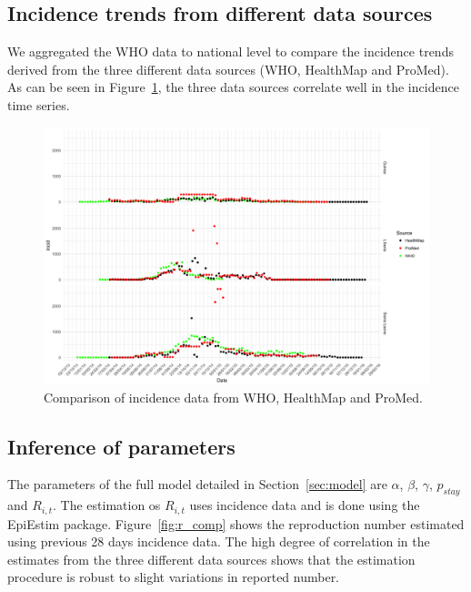 \documentclass[11pt,]{article}
\begin{document}
\subsection{Incidence trends from different data sources}
We aggregated the WHO data to national level to compare the incidence
trends derived from the three different data sources (WHO, HealthMap
and ProMed). As can be seen in Figure~\ref{fig:incid_comp}, the
three data sources correlate well in the incidence time series.

\begin{figure}
    \centering
        \includegraphics[width=\textwidth]{ms6-figures/who_vs_hm_vs_pm-incid}
        \caption{Comparison of incidence data from WHO, HealthMap and ProMed.}
        \label{fig:incid_comp}
  \end{figure}

\subsection{Inference of parameters}

The parameters of the full model detailed in Section~\ref{sec:model} are
$\alpha$, $\beta$, $\gamma$, $p_{stay}$ and $R_{i, t}$. The
estimation os $R_{i, t}$ uses incidence data and is done using the
EpiEstim package. Figure~\ref{fig:r_comp} shows the
reproduction number estimated using previous 28 days incidence
data. The high degree of correlation in the estimates from the three
different data sources shows that the estimation procedure is robust
to slight variations in reported number.
\end{document}
